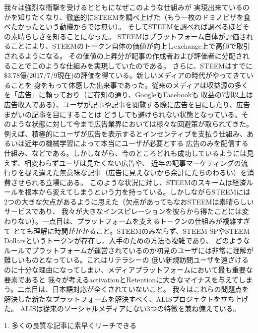 \documentclass{jsarticle}
\begin{document}
我々は強烈な衝撃を受けるとともになぜこのような仕組みが
実現出来ているのかを知りたくなり、徹底的にSTEEMを調べ上げた（もう一枚のドミノピザを食べたかったという動機からでは無い）。
そしてSTEEMを調べれば調べるほどその素晴らしさを知ることになった。
STEEMはプラットフォーム自体が評価されることにより、STEEMのトークン自体の価値が向上しexchange上で高値で取引されるようになる。
その価値の上昇分が記事の作成者および評価者に分配されることでこのような仕組みを実現していたのである。
さらに、STEEMはすでに\$3.78億(2017/7/9現在)の評価を得ている。新しいメディアの時代がやってきていることを
身をもって体感した出来事であった。従来のメディアは収益源の多くを「広告」に頼っており（ご存知の通り、GoogleもFacebookも
収益の7割以上は広告収入である）、ユーザが記事や記事を閲覧する際に広告を目にしたり、広告まがいの記事を目にすることは
どうしても避けられない状態となっている。そのような状態に対して今まで広告業界においては様々な回避策が取られてきた。
例えば、積極的にユーザが広告を表示するとインセンティブを支払う仕組み、あるいは近年の機械学習によって本当にユーザが必要とする
広告のみを配信する仕組み、などである。しかしながら、今のところどれも成功しているようには見えず、相変わらずユーザは見たくない広告や、
近年の記事マーケティングの流行りを捉え違えた無意味な記事（広告に見えないから余計にたちのわるい）を消費させられる立場にある。
このような状況に対し、STEEMのスキームは経済ルールを根本から変えてしまうという力を持っている。しかしながらSTEEMには
2つの大きな欠点があるように思えた（欠点があってもなおSTEEMは素晴らしいサービスであり、
我々が大きなインスピレーションを彼らから得たことには変わりない）。一点目は、プラットフォームを支えるトークンの仕組みが複雑すぎて
とても理解に時間がかかること。STEEMのみならず、STEEM SPやSTEEM Dollarsというトークンが存在し、入手のための方法も複雑であり、
どのようなルールでプラットフォームが運営されているのか初見のユーザには非常に理解が難しいものとなっている。これはリテラシーの
低い新規訪問ユーザを遠ざけるのに十分な理由になってしまい、メディアプラットフォームにおいて最も重要な要素であると
我々が考えるactivationとRetentionに大きなマイナスを与えてしまう。二点目は、日本語対応が全くされていないこと。
我々はこれらの問題点を解決した新たなプラットフォームを解決すべく、ALISプロジェクトを立ち上げた。
ALISは従来のソーシャルメディアにない3つの特徴を兼ね備えている。

1. 多くの良質な記事に素早くリーチできる
\end{document}
